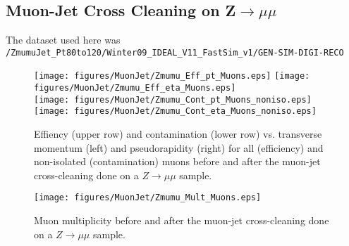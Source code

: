 \documentclass{cmspaper}
\begin{document}
\begin{appendix}
\clearpage
\section{Muon-Jet Cross Cleaning on Z$ \rightarrow \mu\mu$}
\label{app:Zmumu}
The dataset used here was \texttt{/ZmumuJet\_Pt80to120/Winter09\_IDEAL\_V11\_FastSim\_v1/GEN-SIM-DIGI-RECO}
\newline
\begin{figure}[hb]
\begin{center}
    \texttt{[image: figures/MuonJet/Zmumu\_Eff\_pt\_Muons.eps]}
    \texttt{[image: figures/MuonJet/Zmumu\_Eff\_eta\_Muons.eps]}\\
    \texttt{[image: figures/MuonJet/Zmumu\_Cont\_pt\_Muons\_noniso.eps]}
    \texttt{[image: figures/MuonJet/Zmumu\_Cont\_eta\_Muons\_noniso.eps]}
    \caption{Effiency (upper row) and contamination (lower row) vs. transverse
    momentum (left) and pseudorapidity (right) for all (efficiency) and non-isolated (contamination) muons before and after the
    muon-jet cross-cleaning done on a \(Z\rightarrow\mu\mu\) sample.}
    \label{fig:effCont_muon_MuonJet_Zmumu}
\end{center}
\end{figure}

\begin{figure}[hb]
\begin{center}
    \texttt{[image: figures/MuonJet/Zmumu\_Mult\_Muons.eps]}
    \caption{Muon multiplicity before and after the muon-jet cross-cleaning
    done on a \(Z\rightarrow\mu\mu\) sample.}
    \label{fig:muon_mult_MuonJet_Zmumu}
\end{center}
\end{figure}



\end{appendix}
\end{document}
